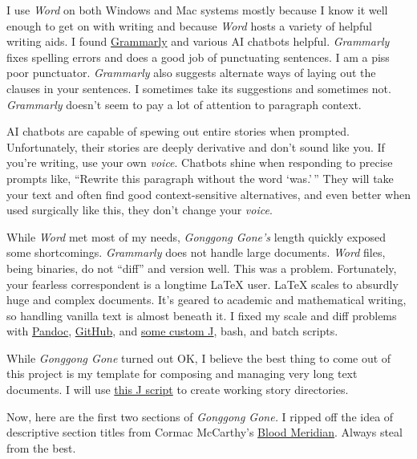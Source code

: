 I use \emph{Word} on both Windows and Mac systems mostly because I know
it well enough to get on with writing and because \emph{Word} hosts a
variety of helpful writing aids. I found
\href{https://www.grammarly.com/}{Grammarly} and various AI chatbots
helpful. \emph{Grammarly} fixes spelling errors and does a good job of
punctuating sentences. I am a piss poor punctuator. \emph{Grammarly}
also suggests alternate ways of laying out the clauses in your
sentences. I sometimes take its suggestions and sometimes not.
\emph{Grammarly} doesn't seem to pay a lot of attention to paragraph
context.

AI chatbots are capable of spewing out entire stories when prompted.
Unfortunately, their stories are deeply derivative and don't sound like
you. If you're writing, use your own \emph{voice}. Chatbots shine when
responding to precise prompts like, ``Rewrite this paragraph without the
word `was.'\,'' They will take your text and often find good
context-sensitive alternatives, and even better when used surgically
like this, they don't change your \emph{voice}.

While \emph{Word} met most of my needs, \emph{Gonggong Gone's} length
quickly exposed some shortcomings. \emph{Grammarly} does not handle
large documents. \emph{Word} files, being binaries, do not ``diff'' and
version well. This was a problem. Fortunately, your fearless
correspondent is a longtime LaTeX user. LaTeX scales to absurdly huge
and complex documents. It's geared to academic and mathematical writing,
so handling vanilla text is almost beneath it. I fixed my scale and diff
problems with \href{https://pandoc.org/}{Pandoc},
\href{https://github.com/}{GitHub}, and
\href{https://wiki.jsoftware.com/wiki/Guides/GettingStarted}{some custom
J}, bash, and batch scripts.

While \emph{Gonggong Gone} turned out OK, I believe the best thing to
come out of this project is my template for composing and managing very
long text documents. I will use
\href{https://github.com/bakerjd99/jackshacks/commit/180557a189cf77b256d8540e0a964d261dd25953\#diff-5af772d764c0ebbfe2aca599489c07ab689f7d78f4c24c7375d93ba3101c44f6}{this
J script} to create working story directories.

Now, here are the first two sections of \emph{Gonggong Gone.} I ripped
off the idea of descriptive section titles from Cormac McCarthy's
\href{https://www.goodreads.com/book/show/394535.Blood_Meridian_or_the_Evening_Redness_in_the_West}{Blood
Meridian}. Always steal from the best.

